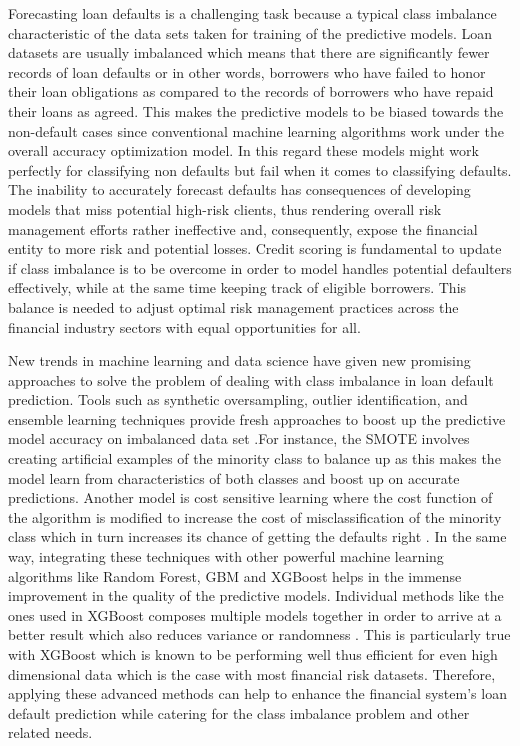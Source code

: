 \documentclass[12pt, a4paper,oneside]{book}
\numberwithin{equation}{section}
\begin{document}
Forecasting loan defaults is a challenging task because a typical class imbalance characteristic of the data sets taken for training of the predictive models. Loan datasets are usually imbalanced which means that there are significantly fewer records of loan defaults or in other words, borrowers who have failed to honor their loan obligations as compared to the records of borrowers who have repaid their loans as agreed. This makes the predictive models to be biased towards the non-default cases since conventional machine learning algorithms work under the overall accuracy optimization model. In this regard these models might work perfectly for classifying non defaults but fail when it comes to classifying defaults. The inability to accurately forecast defaults has consequences of developing models that miss potential high-risk clients, thus rendering overall risk management efforts rather ineffective and, consequently, expose the financial entity to more risk and potential losses. Credit scoring is fundamental to update if class imbalance is to be overcome in order to model handles potential defaulters effectively, while at the same time keeping track of eligible borrowers. This balance is needed to adjust optimal risk management practices across the financial industry sectors with equal opportunities for all.

New trends in machine learning and data science have given new promising approaches to solve the problem of dealing with class imbalance in loan default prediction. Tools such as synthetic oversampling, outlier identification, and ensemble learning techniques provide fresh approaches to boost up the predictive model accuracy on imbalanced data set \cite{dina}.For instance, the SMOTE involves creating artificial examples of the minority class to balance up as this makes the model learn from characteristics of both classes and boost up on accurate predictions. Another model is cost sensitive learning where the cost function of the algorithm is modified to increase the cost of misclassification of the minority class which in turn increases its chance of getting the defaults right \cite{elkan}. In the same way, integrating these techniques with other powerful machine learning algorithms like Random Forest, GBM and XGBoost helps in the immense improvement in the quality of the predictive models. Individual methods like the ones used in XGBoost composes multiple models together in order to arrive at a better result which also reduces variance or randomness \cite{chen}. This is particularly true with XGBoost which is known to be performing well thus efficient for even high dimensional data which is the case with most financial risk datasets. Therefore, applying these advanced methods can help to enhance the financial system’s loan default prediction while catering for the class imbalance problem and other related needs.
\end{document}

